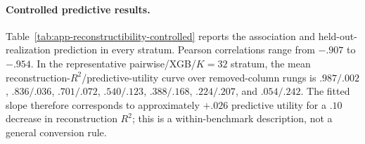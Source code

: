 
\paragraph{Controlled predictive results.}
Table~\ref{tab:app-reconstructibility-controlled} reports the association and
held-out-realization prediction in every stratum.  Pearson correlations range
from $-.907$ to $-.954$.  In the representative pairwise/XGB/$K=32$ stratum,
the mean reconstruction-$R^2$/predictive-utility curve over removed-column
rungs is $.987/.002$, $.836/.036$, $.701/.072$, $.540/.123$, $.388/.168$,
$.224/.207$, and $.054/.242$.  The fitted slope therefore corresponds to
approximately $+.026$ predictive utility for a $.10$ decrease in
reconstruction $R^2$; this is a within-benchmark description, not a general
conversion rule.

